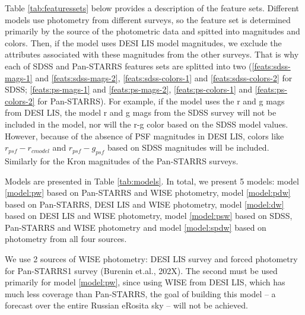 \documentclass[fleqn,usenatbib]{mnras}
\begin{document}
Table \ref{tab:featuressets} below provides a description of the feature sets. Different models use photometry from different surveys, so the feature set is determined primarily by the source of the photometric data and spitted into magnitudes and colors. Then, if the model uses DESI LIS model magnitudes, we exclude the attributes associated with these magnitudes from the other surveys. That is why each of SDSS and Pan-STARRS features sets are splitted into two (\ref{feats:sdss-mags-1} and \ref{feats:sdss-mags-2}, \ref{feats:sdss-colors-1} and \ref{feats:sdss-colors-2} for SDSS; \ref{feats:ps-mags-1} and \ref{feats:ps-mags-2}, \ref{feats:ps-colors-1} and \ref{feats:ps-colors-2} for Pan-STARRS). For example, if the model uses the r and g mags from DESI LIS, the model r and g mags from the SDSS survey will not be included in the model, nor will the r-g color based on the SDSS model values. However, because of the absence of PSF magnitudes in DESI LIS, colors like $r_{psf} - r_{cmodel}$ and $r_{psf} - g_{psf}$ based on SDSS magnitudes will be included. Similarly for the Kron magnitudes of the Pan-STARRS surveys.

Models are presented in Table \ref{tab:models}. In total, we present 5 models: model \ref{model:pw} based on Pan-STARRS and WISE photometry, model \ref{model:pdw} based on Pan-STARRS, DESI LIS and WISE photometry, model \ref{model:dw} based on DESI LIS and WISE photometry, model \ref{model:psw} based on SDSS, Pan-STARRS and WISE photometry and model \ref{model:spdw} based on photometry from all four sources.

We use 2 sources of WISE photometry: DESI LIS survey and forced photometry for Pan-STARRS1 survey (Burenin et.al., 202X). The second must be used primarily for model \ref{model:pw}, since using WISE from DESI LIS, which has much less coverage than Pan-STARRS, the goal of building this model -- a forecast over the entire Russian eRosita sky -- will not be achieved.
\end{document}

